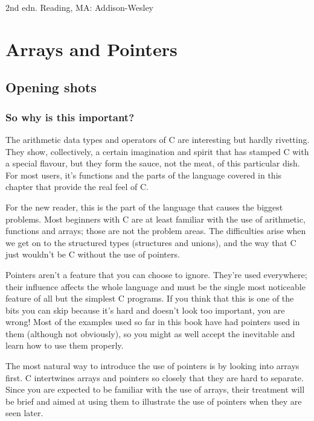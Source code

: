  2nd edn.
     Reading, MA: Addison-Wesley

\chapter{Arrays and Pointers}


        \section{Opening shots}
        

  

  \subsection{So why is this important?}
   

   The arithmetic data types and operators of C are interesting but
    hardly rivetting. They show, collectively, a certain imagination and
    spirit that has stamped C with a special flavour, but they form the
    sauce, not the meat, of this particular dish. For most users, it's
    functions and the parts of the language covered in this chapter that
    provide the real feel of C.


   For the new reader, this is the part of the language that causes the
    biggest problems. Most beginners with C are at least familiar with the
    use of arithmetic, functions and arrays; those are not the problem
    areas.  The difficulties arise when we get on to the structured types
    (structures and unions), and the way that C just wouldn't be C without
    the use of pointers.


   Pointers aren't a feature that you can choose to ignore. They're used
    everywhere; their influence affects the whole language and must be the
    single most noticeable feature of all but the simplest C programs. If
    you think that this is one of the bits you can skip because it's hard
    and doesn't look too important, you are wrong! Most of the examples used
    so far in this book have had pointers used in them (although not
    obviously), so you might as well accept the inevitable and learn how to
    use them properly.


   The most natural way to introduce the use of pointers is by looking
    into arrays first. C intertwines arrays and pointers so closely that
    they are hard to separate. Since you are expected to be familiar with
    the use of arrays, their treatment will be brief and aimed at using them
    to illustrate the use of pointers when they are seen later.


